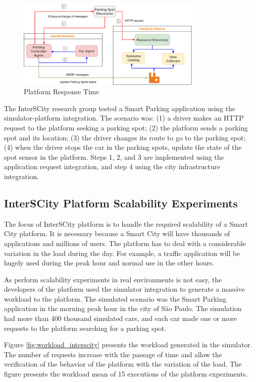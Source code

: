 \begin{figure}[!htb]
\centering
\includegraphics[width=0.8\textwidth]{figuras/chap-uses/integration.png}
\caption{Platform Response Time}
\label{fig:integration}
\end{figure}

The InterSCity research group tested a Smart Parking application using the simulator-platform integration. The scenario was: (1) a driver makes an HTTP request to the platform seeking a parking spot; (2) the platform sends a parking spot and its location; (3) the driver changes its route to go to the parking spot; (4) when the driver stops the car in the parking spots, update the state of the spot sensor in the platform. Steps 1, 2, and 3 are implemented using the application request integration, and step 4 using the city infrastructure integration.

\subsection{InterSCity Platform Scalability Experiments}
\label{sec:test}

The focus of InterSCity platform is to handle the required scalability of a Smart City platform. It is necessary because a Smart City will have thousands of applications and millions of users. The platform has to deal with a considerable variation in the load during the day. For example, a traffic application will be hugely used during the peak hour and normal use in the other hours.

As perform scalability experiments in real environments is not easy, the developers of the platform used the simulator integration to generate a massive workload to the platform. The simulated scenario was the Smart Parking application in the morning peak hour in the city of S\~ao Paulo. The simulation had more than 400 thousand simulated cars, and each car made one or more requests to the platform searching for a parking spot.

Figure \ref{fig:workload_interscity} presents the workload generated in the simulator. The number of requests increase with the passage of time and allow the verification of the behavior of the platform with the variation of the load. The figure presents the workload mean of 15 executions of the platform experiments.

